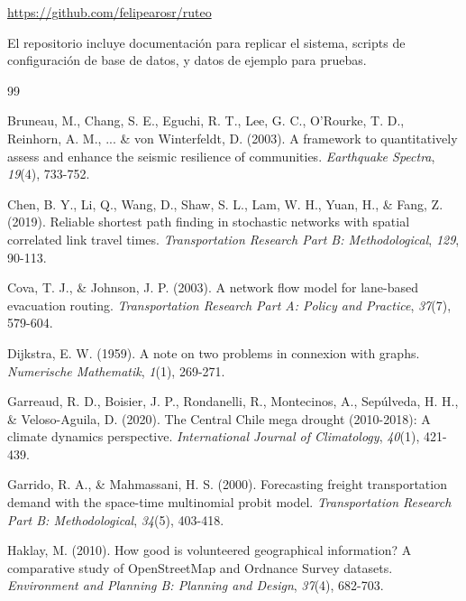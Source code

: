 \documentclass[conference]{IEEEtran}
\begin{document}
\begin{center}
\url{https://github.com/felipearosr/ruteo}
\end{center}

El repositorio incluye documentación para replicar el sistema, scripts de configuración de base de datos, y datos de ejemplo para pruebas.

\begin{thebibliography}{99}

Bruneau, M., Chang, S. E., Eguchi, R. T., Lee, G. C., O'Rourke, T. D., Reinhorn, A. M., ... \& von Winterfeldt, D. (2003). A framework to quantitatively assess and enhance the seismic resilience of communities. \textit{Earthquake Spectra}, \textit{19}(4), 733-752.

Chen, B. Y., Li, Q., Wang, D., Shaw, S. L., Lam, W. H., Yuan, H., \& Fang, Z. (2019). Reliable shortest path finding in stochastic networks with spatial correlated link travel times. \textit{Transportation Research Part B: Methodological}, \textit{129}, 90-113.

Cova, T. J., \& Johnson, J. P. (2003). A network flow model for lane-based evacuation routing. \textit{Transportation Research Part A: Policy and Practice}, \textit{37}(7), 579-604.

Dijkstra, E. W. (1959). A note on two problems in connexion with graphs. \textit{Numerische Mathematik}, \textit{1}(1), 269-271.

Garreaud, R. D., Boisier, J. P., Rondanelli, R., Montecinos, A., Sepúlveda, H. H., \& Veloso-Aguila, D. (2020). The Central Chile mega drought (2010-2018): A climate dynamics perspective. \textit{International Journal of Climatology}, \textit{40}(1), 421-439.

Garrido, R. A., \& Mahmassani, H. S. (2000). Forecasting freight transportation demand with the space-time multinomial probit model. \textit{Transportation Research Part B: Methodological}, \textit{34}(5), 403-418.

Haklay, M. (2010). How good is volunteered geographical information? A comparative study of OpenStreetMap and Ordnance Survey datasets. \textit{Environment and Planning B: Planning and Design}, \textit{37}(4), 682-703.


\end{thebibliography}
\end{document}
